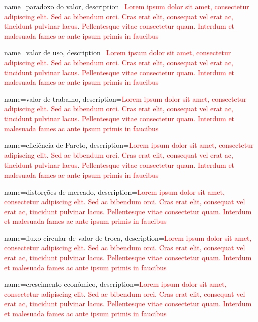{
	name=paradoxo do valor,
	description={\textcolor{red}{Lorem ipsum dolor sit amet, consectetur adipiscing elit. Sed ac bibendum orci. Cras erat elit, consequat vel erat ac, tincidunt pulvinar lacus. Pellentesque vitae consectetur quam. Interdum et malesuada fames ac ante ipsum primis in faucibus}}
}

{
	name=valor de uso,
	description={\textcolor{red}{Lorem ipsum dolor sit amet, consectetur adipiscing elit. Sed ac bibendum orci. Cras erat elit, consequat vel erat ac, tincidunt pulvinar lacus. Pellentesque vitae consectetur quam. Interdum et malesuada fames ac ante ipsum primis in faucibus}}
}

{
	name=valor de trabalho,
	description={\textcolor{red}{Lorem ipsum dolor sit amet, consectetur adipiscing elit. Sed ac bibendum orci. Cras erat elit, consequat vel erat ac, tincidunt pulvinar lacus. Pellentesque vitae consectetur quam. Interdum et malesuada fames ac ante ipsum primis in faucibus}}
}

{
	name=eficiência de Pareto,
	description={\textcolor{red}{Lorem ipsum dolor sit amet, consectetur adipiscing elit. Sed ac bibendum orci. Cras erat elit, consequat vel erat ac, tincidunt pulvinar lacus. Pellentesque vitae consectetur quam. Interdum et malesuada fames ac ante ipsum primis in faucibus}}
}

{
	name=distorções de mercado,
	description={\textcolor{red}{Lorem ipsum dolor sit amet, consectetur adipiscing elit. Sed ac bibendum orci. Cras erat elit, consequat vel erat ac, tincidunt pulvinar lacus. Pellentesque vitae consectetur quam. Interdum et malesuada fames ac ante ipsum primis in faucibus}}
}

{
	name=fluxo circular de valor de troca,
	description={\textcolor{red}{Lorem ipsum dolor sit amet, consectetur adipiscing elit. Sed ac bibendum orci. Cras erat elit, consequat vel erat ac, tincidunt pulvinar lacus. Pellentesque vitae consectetur quam. Interdum et malesuada fames ac ante ipsum primis in faucibus}}
}

{
	name=crescimento econômico,
	description={\textcolor{red}{Lorem ipsum dolor sit amet, consectetur adipiscing elit. Sed ac bibendum orci. Cras erat elit, consequat vel erat ac, tincidunt pulvinar lacus. Pellentesque vitae consectetur quam. Interdum et malesuada fames ac ante ipsum primis in faucibus}}
}

